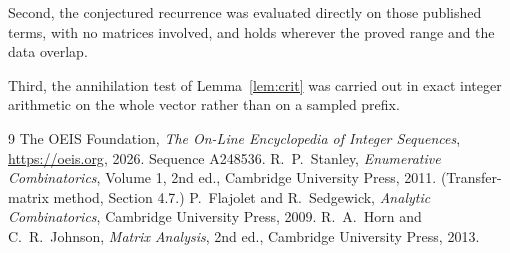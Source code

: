 \documentclass[11pt,a4paper]{article}
\theoremstyle{plain}
\theoremstyle{definition}
\begin{document}
Second, the conjectured recurrence was evaluated directly on those published terms, with no
matrices involved, and holds wherever the proved range and the data overlap.

Third, the annihilation test of Lemma~\ref{lem:crit} was carried out in exact integer
arithmetic on the whole vector rather than on a sampled prefix.

\begin{thebibliography}{9}
 The OEIS Foundation, \emph{The On-Line Encyclopedia of Integer
Sequences}, \url{https://oeis.org}, 2026. Sequence A248536.
 R.~P.~Stanley, \emph{Enumerative Combinatorics}, Volume 1, 2nd ed.,
Cambridge University Press, 2011. (Transfer-matrix method, Section 4.7.)
 P.~Flajolet and R.~Sedgewick, \emph{Analytic Combinatorics}, Cambridge
University Press, 2009.
 R.~A.~Horn and C.~R.~Johnson, \emph{Matrix Analysis}, 2nd ed., Cambridge
University Press, 2013.
\end{thebibliography}
\end{document}
